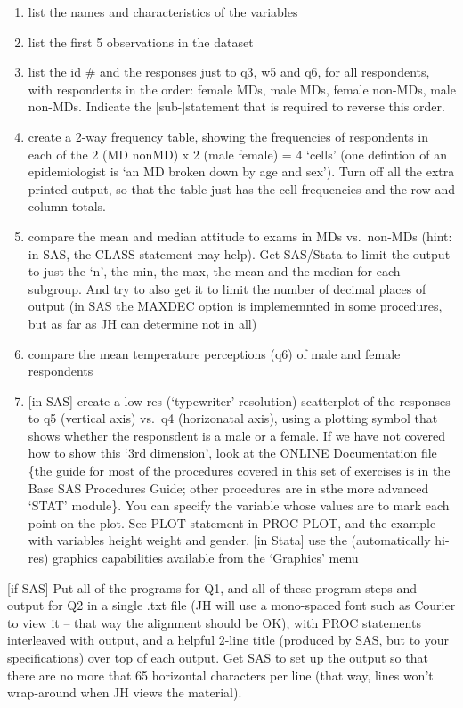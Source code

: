 \documentclass[]{book}
\begin{document}
\begin{enumerate}
\def\labelenumi{(\roman{enumi})}
\item
  list the names and characteristics of the variables
\item
  list the first 5 observations in the dataset
\item
  list the id \# and the responses just to q3, w5 and q6, for all respondents, with respondents in the order: female MDs, male MDs, female non-MDs, male non-MDs. Indicate the {[}sub-{]}statement that is required to reverse this order.
\item
  create a 2-way frequency table, showing the frequencies of respondents in each of the 2 (MD nonMD) x 2 (male female) = 4 `cells' (one defintion of an epidemiologist is `an MD broken down by age and sex'). Turn off all the extra printed output, so that the table just has the cell frequencies and the row and column totals.
\item
  compare the mean and median attitude to exams in MDs vs.~non-MDs (hint: in SAS, the CLASS statement may help). Get SAS/Stata to limit the output to just the `n', the min, the max, the mean and the median for each subgroup. And try to also get it to limit the number of decimal places of output (in SAS the MAXDEC option is implememnted in some procedures, but as far as JH can determine not in all)
\item
  compare the mean temperature perceptions (q6) of male and female respondents
\item
  {[}in SAS{]} create a low-res (`typewriter' resolution) scatterplot of the responses to q5 (vertical axis) vs.~q4 (horizonatal axis), using a plotting symbol that shows whether the responsdent is a male or a female. If we have not covered how to show this `3rd dimension', look at the ONLINE Documentation file \{the guide for most of the procedures covered in this set of exercises is in the Base SAS Procedures Guide; other procedures are in sthe more advanced `STAT' module\}. You can specify the variable whose values are to mark each point on the plot. See PLOT statement in PROC PLOT, and the example with variables height weight and gender.
  {[}in Stata{]} use the (automatically hi-res) graphics capabilities available from the `Graphics' menu
\end{enumerate}

{[}if SAS{]} Put all of the programs for Q1, and all of these program steps and output for Q2 in a single .txt file (JH will use a mono-spaced font such as Courier to view it -- that way the alignment should be OK), with PROC statements interleaved with output, and a helpful 2-line title (produced by SAS, but to your specifications) over top of each output. Get SAS to set up the output so that there are no more that 65 horizontal characters per line (that way, lines won't wrap-around when JH views the material).
\end{document}
